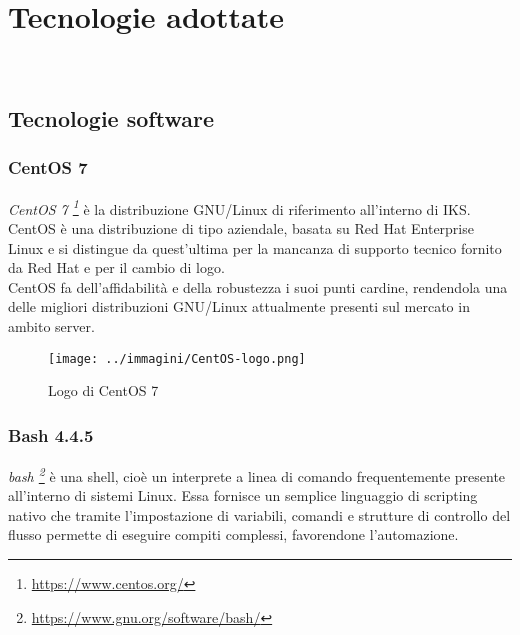 
\pagestyle{IHA-fancy-style}
\chapter{Tecnologie adottate}
\label{cap:tecnologie-adottate}

\\

\section{Tecnologie software}

\subsection{CentOS 7}

\textit{\gls{CentOS} 7 \footnote{\url{https://www.centos.org/}}} è la distribuzione \gls{GNU}/\gls{Linux} di riferimento all'interno di IKS. \gls{CentOS} è una distribuzione di tipo aziendale, basata su \gls{Red Hat} Enterprise \gls{Linux} e si distingue da quest'ultima per la mancanza di supporto tecnico fornito da \gls{Red Hat} e per il cambio di logo.\\
\gls{CentOS} fa dell'affidabilità e della robustezza i suoi punti cardine, rendendola una delle migliori distribuzioni \gls{GNU}/\gls{Linux} attualmente presenti sul mercato in ambito server.

\begin{figure}[H]
    \capstart
    \centering
    \texttt{[image: ../immagini/CentOS-logo.png]}
    \caption{Logo di CentOS 7}
\end{figure}

\subsection{Bash 4.4.5}

\textit{\gls{bash} \footnote{\url{https://www.gnu.org/software/bash/}}} è una shell, cioè un interprete a linea di comando frequentemente presente all'interno di sistemi \gls{Linux}. Essa fornisce un semplice linguaggio di scripting nativo che tramite l'impostazione di variabili, comandi e strutture di controllo del flusso permette di eseguire compiti complessi, favorendone l'automazione.

